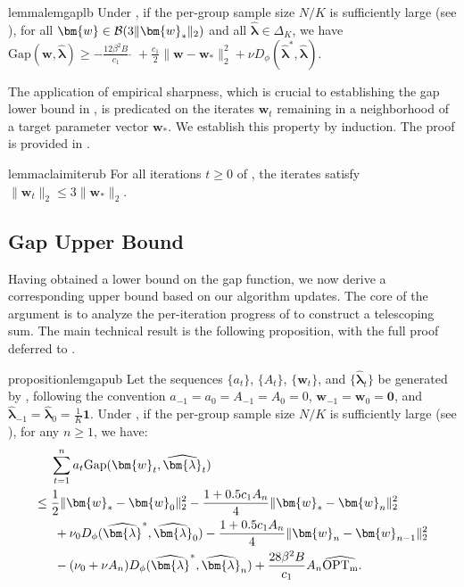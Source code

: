 \documentclass[11pt]{article}
\newcounter{thm}
\numberwithin{thm}{section}
\theoremstyle{plain}
\theoremstyle{definition}
\theoremstyle{remark} \newtheorem{remark}[thm]{Remark}
\def\vlambda{{\bm{\lambda}}}
\def\vw{{\bm{w}}}
\def\cB{{\mathcal{B}}}
\newcommand{\Gap}{\mathrm{Gap}}
\DeclarePairedDelimiter\norm{\|}{\|}
\newcommand{\evlambda}{\widehat{\vlambda}}
\DeclareMathOperator{\mOPT}{OPT_m}
\newcommand{\mOPThat}{\widehat{\mOPT}}
\def\mathbf{\bm}
\begin{document}
\begin{restatable}{lemma}{lemgaplb}\label{lemma:gap-lower-bound}
  Under ,  
if the per-group sample size $N/K$ is sufficiently large (see ),  for all \(\vw \in \cB(3\norm{\vw_*}_{2})\) and all $\evlambda \in \Delta_K$, we have
  \(\Gap(\vw ,\evlambda) \ge -\frac{12\beta^2 {B}}{c_1}\mOPThat + \frac{c_1}{2} \|\vw - \vw_*\|_{2}^{2} + \nu D_{\phi}(\evlambda^{*}, \evlambda).\)
\end{restatable}

The application of empirical sharpness, which is crucial to establishing the gap lower bound in , is predicated on the iterates $\vw_t$ remaining in a neighborhood of a target parameter vector $\vw_*$. We establish this property by induction. The proof is provided in {}. 

\begin{restatable}{lemma}{claimiterub}\label{claim:iteration-norm-ub}
    For all iterations $t\ge 0$ of , the iterates satisfy $\|\vw_t\|_2 \le 3\|\vw_*\|_2$.
\end{restatable}

\subsection{Gap Upper Bound}

Having obtained a lower bound on the gap function, we now derive a corresponding upper bound based on our algorithm updates. The core of the argument is to analyze the per-iteration progress of  to construct a telescoping sum. 
The main technical result is the following proposition, with the full proof deferred to .

\begin{restatable}{proposition}{lemgapub}\label{lemma:gap-upper-bound}
    Let the sequences $\{a_t\}$, $\{A_t\}$, $\{\vw_t\}$, and $\{\evlambda_t\}$ be generated by , following the convention $a_{-1}=a_0=A_{-1}=A_0=0$, $\vw_{-1}=\vw_0=\mathbf{0}$, and $\evlambda_{-1}=\evlambda_0=\tfrac{1}{K}\mathbf{1}$. Under ,  
if the per-group sample size $N/K$ is sufficiently large (see ), for any $n \ge 1$, we have:
    \begin{align*}
    &\sum_{t=1}^n a_t \Gap(\vw_t,\evlambda_t) \\
    \le\; & \frac{1}{2}\|\vw_*-\vw_0\|_2^2 - \frac{1+0.5c_1A_n}{4}\|\vw_*-\vw_n\|_2^2 \\
    &\;+ \nu_0 D_{\phi}(\evlambda^{*}, \evlambda_0)-\frac{1+0.5c_1A_n}{4}\|\vw_n-\vw_{n-1}\|_2^2 \\
    &\;-(\nu_0+\nu A_n)D_{\phi}(\evlambda^{*}, \evlambda_{n}) + \frac{28\beta^2B}{c_1} A_n \mOPThat. \notag
    \end{align*}
\end{restatable}
\end{document}
